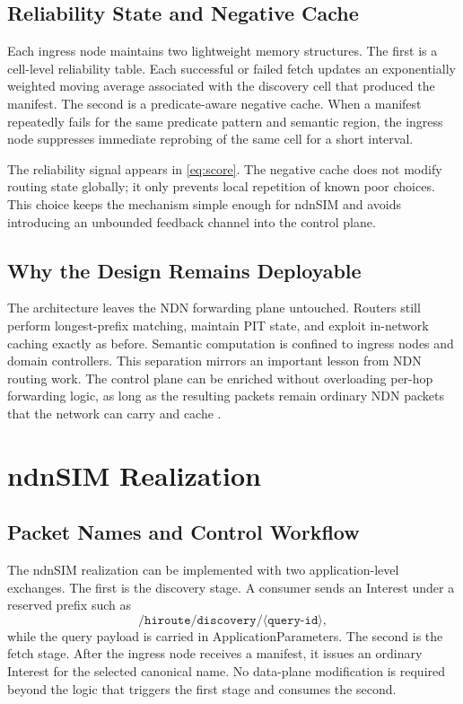 \documentclass[journal]{IEEEtran}
\newcommand{\ap}{ApplicationParameters}
\begin{document}
\subsection{Reliability State and Negative Cache}

Each ingress node maintains two lightweight memory structures. The first is a cell-level reliability table. Each successful or failed fetch updates an exponentially weighted moving average associated with the discovery cell that produced the manifest. The second is a predicate-aware negative cache. When a manifest repeatedly fails for the same predicate pattern and semantic region, the ingress node suppresses immediate reprobing of the same cell for a short interval.

The reliability signal appears in \eqref{eq:score}. The negative cache does not modify routing state globally; it only prevents local repetition of known poor choices. This choice keeps the mechanism simple enough for ndnSIM and avoids introducing an unbounded feedback channel into the control plane.

\subsection{Why the Design Remains Deployable}

The architecture leaves the NDN forwarding plane untouched. Routers still perform longest-prefix matching, maintain PIT state, and exploit in-network caching exactly as before. Semantic computation is confined to ingress nodes and domain controllers. This separation mirrors an important lesson from NDN routing work. The control plane can be enriched without overloading per-hop forwarding logic, as long as the resulting packets remain ordinary NDN packets that the network can carry and cache \cite{nlsr,hrouting}.

\section{ndnSIM Realization}

\subsection{Packet Names and Control Workflow}

The ndnSIM realization can be implemented with two application-level exchanges. The first is the discovery stage. A consumer sends an Interest under a reserved prefix such as
\begin{equation}
/\texttt{hiroute/discovery}/\langle\texttt{query-id}\rangle,
\end{equation}
while the query payload is carried in \ap{}. The second is the fetch stage. After the ingress node receives a manifest, it issues an ordinary Interest for the selected canonical name. No data-plane modification is required beyond the logic that triggers the first stage and consumes the second.
\end{document}
